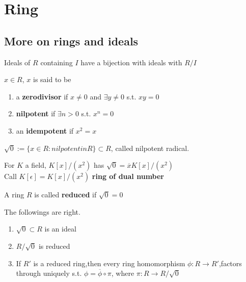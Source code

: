 \section{Ring}
\subsection{More on rings and ideals}
\begin{theorem}
    Ideals of  $ R  $ containing  $ I  $ have a bijection with ideals with  $ R/I  $ 
\end{theorem}
\begin{definition}
     $ x\in R $, $ x  $ is said to be 
     \begin{enumerate}
        \item a \textbf{zerodivisor} if  $ x\not=0  $ and  $ \exists y\not=0  $ s.t.  $ xy=0 $
        \item \textbf{nilpotent} if  $ \exists n>0  $ s.t.  $ x^n=0 $
        \item an \textbf{idempotent} if  $ x^2=x $   
     \end{enumerate} 
\end{definition}
\begin{definition}
     $ \sqrt{0}:=\{x\in R: nilpotent in R\}\subset R $, called nilpotent radical.
\end{definition}
\begin{example}
    For  $ K  $ a field, $ K[x]/(x^2 ) $ has  $ \sqrt{0}=\overline{x}K[x]/(x^2)  $\\
    Call  $ K[\epsilon]=K[x]/(x^2) $ \textbf{ring of dual number} 
\end{example}
\begin{definition}
    A ring  $ R  $ is called \textbf{reduced} if  $ \sqrt{0}=0 $ 
\end{definition}
\begin{proposition}
    The followings are right.
    \begin{enumerate}
        \item  $ \sqrt{0}\subset R  $ is an ideal
        \item  $ R/\sqrt{0} $ is reduced
        \item If  $ R'  $ is a reduced ring,then every ring homomorphism  $ \phi:R\rightarrow R'  $,factors through uniquely s.t.  $ \phi=\overline{\phi}\circ \pi $, where  $ \pi:R \rightarrow R/\sqrt{0} $  
    \end{enumerate}
\end{proposition}
